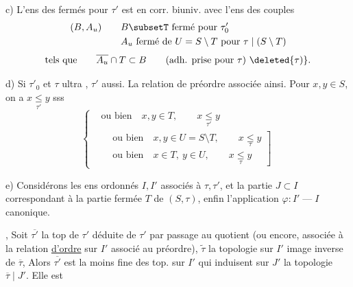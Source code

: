 c) L'ens des fermés pour $\tau'$ est en corr. biuniv. avec l'ens des couples
\[
\begin{aligned}
(B,A_{u}) \qquad & B\subsetT\ \text{fermé pour }\tau'_0\\
& A_u\ \text{fermé de }U=S\setminus T\ \text{pour }\tau\mid(S\setminus T)
\end{aligned}
\]
\[
\text{tels que}\qquad \overline{A_u}\cap T\subset B \qquad
\text{(adh. prise pour }\tau\text{)}\ \deleted{\tau)}.
\]

d) Si $\tau'_0$ et $\tau$ ultra , $\tau'$ aussi. La relation de préordre associée   ainsi. Pour $x,y\in S$, on a $x\underset{\tau'}{\leq}y$ sss
\[
\left\{\begin{aligned}
&\text{ou bien}\quad x,y\in T,\qquad x\underset{\tau'}{\leq}y\\
&\left.\begin{aligned}
&\text{ou bien}\quad x,y\in U=S\setminus T,\qquad x\underset{\tau}{\leq}y\\
&\text{ou bien}\quad x\in T,\ y\in U,\qquad x\underset{\tau}{\leq}y
\end{aligned}\right]
\end{aligned}\right.
\]

e)  Considérons les ens ordonnés $I,I'$ associés à $\tau,\tau'$, et la partie  $J\subset I$ correspondant à la partie fermée $T$ de $(S,\tau)$, enfin l'application $\varphi:I'\mathbin{\text{---}}I$ canonique.

,  Soit $\overline{\tau'}$  la top de $\tau'$ déduite de $\tau'$ par passage au quotient (ou encore, associée à la relation \uline{d'ordre} sur $I'$ associé au préordre), $\widetilde{\tau}$ la topologie sur $I'$ image inverse de $\overline{\tau}$, Alors $\overline{\tau'}$ est la moins fine des top. sur $I'$ qui  induisent sur $J'$ la  topologie $\overline{\tau}\mid J'$. Elle est
